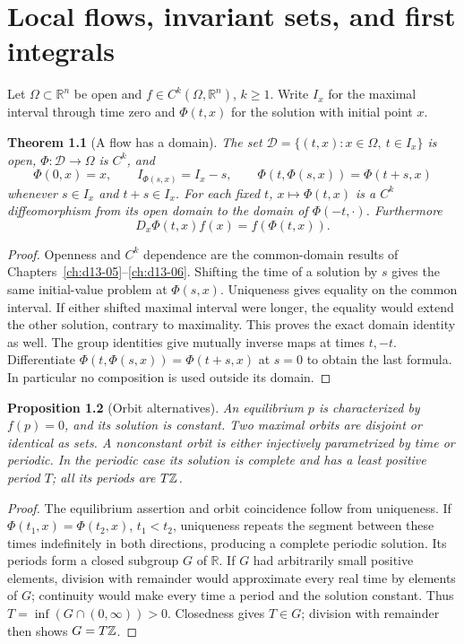 \documentclass[11pt,oneside]{book}
\newtheorem{theorem}{Theorem}[chapter]
\newtheorem{proposition}[theorem]{Proposition}
\theoremstyle{definition}
\theoremstyle{remark}\newtheorem{remark}[theorem]{Remark}
\newcommand{\R}{\mathbb R}\newcommand{\C}{\mathbb C}
\begin{document}


\chapter{Local flows, invariant sets, and first integrals}\label{ch:d13-11}

Let \(\Omega\subset\R^n\) be open and \(f\in C^k(\Omega,\R^n)\),
\(k\ge1\). Write \(I_x\) for the maximal interval through time zero and
\(\Phi(t,x)\) for the solution with initial point \(x\).

\begin{theorem}[A flow has a domain]\label{d13:11:flow}
The set \(\mathcal D=\{(t,x):x\in\Omega,\ t\in I_x\}\) is open,
\(\Phi:\mathcal D\to\Omega\) is \(C^k\), and
\[
 \Phi(0,x)=x,\qquad
 I_{\Phi(s,x)}=I_x-s,\qquad
 \Phi(t,\Phi(s,x))=\Phi(t+s,x)
\]
whenever \(s\in I_x\) and \(t+s\in I_x\).
For each fixed \(t\), \(x\mapsto\Phi(t,x)\) is a \(C^k\) diffeomorphism
from its open domain to the domain of \(\Phi(-t,\cdot)\).
Furthermore
\[
 D_x\Phi(t,x)f(x)=f(\Phi(t,x)).
\]
\end{theorem}
\begin{proof}
Openness and \(C^k\) dependence are the common-domain results of
Chapters~\ref{ch:d13-05}--\ref{ch:d13-06}. Shifting the time of a solution
by \(s\) gives the same initial-value problem at \(\Phi(s,x)\).
Uniqueness gives equality on the common interval. If either shifted
maximal interval were longer, the equality would extend the other solution,
contrary to maximality. This proves the exact domain identity as well.
The group identities give mutually inverse maps at times \(t,-t\).
Differentiate \(\Phi(t,\Phi(s,x))=\Phi(t+s,x)\) at \(s=0\) to obtain the
last formula. In particular no composition is used outside its domain.
\end{proof}

\begin{proposition}[Orbit alternatives]\label{d13:11:orbits}
An equilibrium \(p\) is characterized by \(f(p)=0\), and its solution is
constant. Two maximal orbits are disjoint or identical as sets. A
nonconstant orbit is either injectively parametrized by time or periodic.
In the periodic case its solution is complete and has a least positive
period \(T\); all its periods are \(T\mathbb Z\).
\end{proposition}
\begin{proof}
The equilibrium assertion and orbit coincidence follow from uniqueness.
If \(\Phi(t_1,x)=\Phi(t_2,x)\), \(t_1<t_2\), uniqueness repeats the
segment between these times indefinitely in both directions, producing
a complete periodic solution. Its periods form a closed subgroup \(G\)
of \(\R\). If \(G\) had arbitrarily small positive elements, division
with remainder would approximate every real time by elements of \(G\);
continuity would make every time a period and the solution constant.
Thus \(T=\inf(G\cap(0,\infty))>0\). Closedness gives \(T\in G\);
division with remainder then shows \(G=T\mathbb Z\).
\end{proof}
\end{document}
